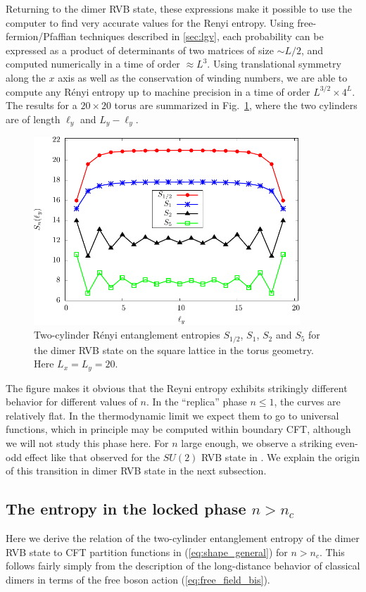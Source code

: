 \documentclass[11pt]{iopart}
\begin{document}
Returning to the dimer RVB state, these expressions make it possible to use the computer to find very accurate values for the Renyi entropy. Using free-fermion/Pfaffian techniques described in \ref{sec:lgv}, each probability can be expressed as a product of determinants of two matrices of size $\sim L/2$, and computed numerically in a time of order $\approx L^3$. Using translational symmetry along the $x$ axis as well as the conservation of winding numbers, we are able to compute any R\'enyi entropy up to machine precision in a time of order $L^{3/2}\times 4^L$.
The results for a $20\times 20$ torus are summarized in Fig.~\ref{fig:ee_d_torus}, where the two cylinders are of length $\ell_y$ and $L_y-\ell_y$. 
\begin{figure}[ht]
 \begin{center}
 \includegraphics[width=10cm]{./figures/ee_d_torus.pdf}
 \end{center}
\caption{Two-cylinder R\'enyi entanglement entropies $S_{1/2}$, $S_1$, $S_2$ and $S_5$ for the dimer RVB state on the square lattice in the torus geometry. Here $L_x=L_y=20$.}
\label{fig:ee_d_torus}
\end{figure}
The figure makes it obvious that the Reyni entropy exhibits strikingly different behavior for different values of $n$. In the ``replica'' phase $n \leq 1$, the curves are relatively flat. In the thermodynamic limit we expect them to go to universal functions, which in principle may be computed within boundary CFT, although we will not study this phase here. For $n$ large enough, we observe a striking even-odd effect like that observed for the $SU(2)$ RVB state in \cite{Ju2012}. We explain the origin of this transition in dimer RVB state in the next subsection.



\subsection{The entropy in the locked phase $n>n_c$}
\label{sec:bpt}
Here we derive the relation of the two-cylinder entanglement entropy of the dimer RVB state to CFT partition functions in 
(\ref{eq:shape_general}) for $n>n_c$. This follows fairly simply from the description of the long-distance behavior of classical dimers in terms of the free boson action (\ref{eq:free_field_bis}).
\end{document}

